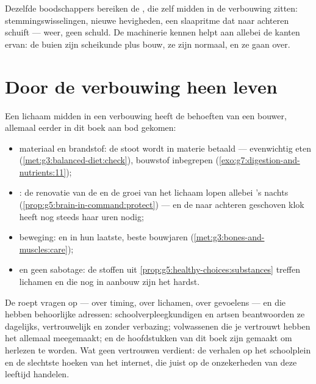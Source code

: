 \begin{remark}\label{rem:g8:puberty:moods}
Dezelfde boodschappers bereiken de , die zelf midden in de
verbouwing zitten: stemmingswisselingen, nieuwe hevigheden, een
slaapritme dat naar achteren schuift --- weer, geen schuld. De machinerie
kennen helpt aan allebei de kanten ervan: de buien zijn scheikunde plus
bouw, ze zijn normaal, en ze gaan over.
\end{remark}

\section{Door de verbouwing heen leven}

\begin{proposition}\label{prop:g8:puberty:care}
Een lichaam midden in een verbouwing heeft de behoeften van een bouwer,
allemaal eerder in dit boek aan bod gekomen:
\begin{itemize}
  \item materiaal en brandstof: de stoot wordt in materie betaald ---
        evenwichtig eten (\cref{met:g3:balanced-diet:check}), bouwstof
        inbegrepen (\cref{exo:g7:digestion-and-nutrients:11});
  \item {}: de renovatie van de  en de groei van het lichaam
        lopen allebei 's nachts
        (\cref{prop:g5:brain-in-command:protect}) --- en de naar achteren
        geschoven klok heeft nog steeds haar uren nodig;
  \item beweging:  en  in hun laatste, beste bouwjaren
        (\cref{met:g3:bones-and-muscles:care});
  \item en geen sabotage: de stoffen uit
        \cref{prop:g5:healthy-choices:substances} treffen lichamen en
         die nog in aanbouw zijn het hardst.
\end{itemize}
\end{proposition}
\admitted

\begin{example}\label{ex:g8:puberty:questions}
De  roept vragen op --- over timing, over lichamen, over gevoelens
--- en die hebben behoorlijke adressen: schoolverpleegkundigen en artsen
beantwoorden ze dagelijks, vertrouwelijk en zonder verbazing; volwassenen
die je vertrouwt hebben het allemaal meegemaakt; en de hoofdstukken van
dit boek zijn gemaakt om herlezen te worden. Wat geen vertrouwen verdient:
de verhalen op het schoolplein en de slechtste hoeken van het internet,
die juist op de onzekerheden van deze leeftijd handelen.
\end{example}

